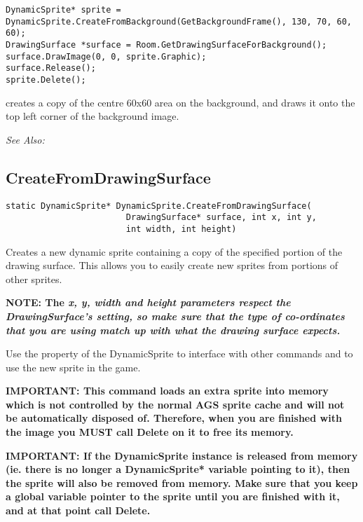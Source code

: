 \begin{verbatim}
DynamicSprite* sprite = DynamicSprite.CreateFromBackground(GetBackgroundFrame(), 130, 70, 60, 60);
DrawingSurface *surface = Room.GetDrawingSurfaceForBackground();
surface.DrawImage(0, 0, sprite.Graphic);
surface.Release();
sprite.Delete();
\end{verbatim}
creates a copy of the centre 60x60 area on the background, and draws it onto the
top left corner of the background image.

\it{See Also:} 


\subsection{CreateFromDrawingSurface}\label{DynamicSprite.CreateFromDrawingSurface}%

\begin{verbatim}
static DynamicSprite* DynamicSprite.CreateFromDrawingSurface(
                        DrawingSurface* surface, int x, int y,
                        int width, int height)
\end{verbatim}
Creates a new dynamic sprite containing a copy of the specified portion of
the drawing surface. This allows you to easily create new sprites from portions
of other sprites.

\bf{NOTE:} The \it{x}, \it{y}, \it{width} and \it{height} parameters respect
the DrawingSurface's 
setting, so make sure that the type of co-ordinates that you are using match
up with what the drawing surface expects.

Use the  property of the DynamicSprite to
interface with other commands and to use the new sprite in the game.

\bf{IMPORTANT:} This command loads an extra sprite into memory which is not controlled
by the normal AGS sprite cache and will not be automatically disposed of. Therefore, when
you are finished with the image you \bf{MUST} call Delete on it to free its memory.

\bf{IMPORTANT:} If the DynamicSprite instance is released from memory (ie. there is
no longer a DynamicSprite* variable pointing to it), then the sprite will also be
removed from memory. Make sure that you keep a global variable pointer to the sprite
until you are finished with it, and at that point call Delete.

